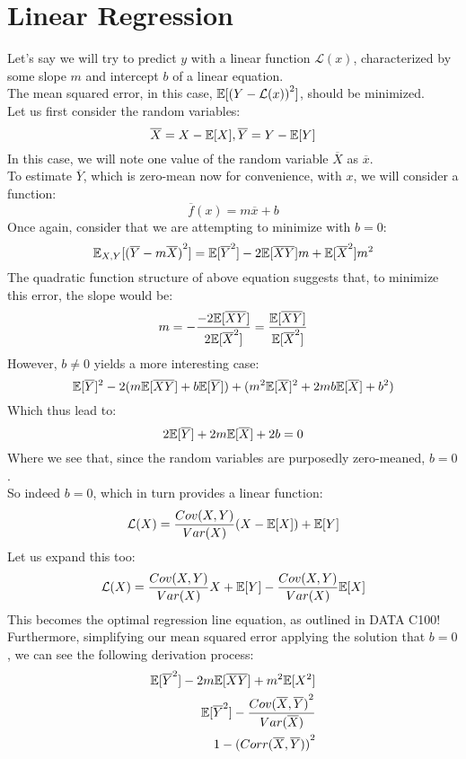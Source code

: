 \section{Linear Regression}
Let's say we will try to predict $y$ with a linear function $\mathcal{L}(x)$, characterized by some slope $m$ and intercept $b$ of a linear equation. \\
The mean squared error, in this case, $\mathbb{E}[{(Y - \mathcal{L}(x))} ^ 2]$, should be minimized. \\
Let us first consider the random variables:
\[\overline{X} = X - \mathbb{E}[X], \overline{Y} = Y - \mathbb{E}[Y]\]
In this case, we will note one value of the random variable $\overline{X}$ as $\overline{x}$. \\
To estimate $\overline{Y}$, which is zero-mean now for convenience, with $x$, we will consider a function:
\[\overline{f}(x) = m \overline{x} + b\]
Once again, consider that we are attempting to minimize with $b = 0$:
\[\mathbb{E}_{X, Y}[{(\overline{Y} - m \overline{X})}^2] = \mathbb{E}[\overline{Y}^2] - 2 \mathbb{E}[\overline{X} \overline{Y}]m + \mathbb{E}[\overline{X}^2]m^2\]
The quadratic function structure of above equation suggests that, to minimize this error, the slope would be:
\[m = -\frac{-2\mathbb{E}[\overline{X} \overline{Y}]}{2 \mathbb{E}[\overline{X}^2]} = \frac{\mathbb{E}[\overline{X} \overline{Y}]}{\mathbb{E}[\overline{X}^2]}\]
However, $b \neq 0$ yields a more interesting case:
\[
    \mathbb{E}[\overline{Y}]^2 - 2(m \mathbb{E}[\overline{X} \overline{Y}] + b \mathbb{E}[\overline{Y}]) + (m^2 \mathbb{E}[\overline{X}]^2 + 2mb\mathbb{E}[\overline{X}] + b^2)
\]
Which thus lead to:
\[
    2\mathbb{E}[\overline{Y}] + 2m\mathbb{E}[\overline{X}] + 2b = 0
\]
Where we see that, since the random variables are purposedly zero-meaned, $b = 0$. \\
So indeed $b = 0$, which in turn provides a linear function:
\[
    \mathcal{L}(X) = \frac{Cov(X, Y)}{Var(X)}(X - \mathbb{E}[X]) + \mathbb{E}[Y]
\]
Let us expand this too:
\[
    \mathcal{L}(X) = \frac{Cov(X, Y)}{Var(X)}X + \mathbb{E}[Y] - \frac{Cov(X, Y)}{Var(X)}\mathbb{E}[X]
\]
This becomes the optimal regression line equation, as outlined in DATA C100! \\
Furthermore, simplifying our mean squared error applying the solution that $b = 0$, we can see the following derivation process:
\begin{align*}
    \mathbb{E}[\overline{Y} ^ 2] - 2m\mathbb{E}[\overline{X} \overline{Y}] + m^2 \mathbb{E}[X^2] \\
    \mathbb{E}[\overline{Y} ^ 2] - \frac{{Cov(\overline{X}, \overline{Y})} ^ 2}{Var(\overline{X})} \\
    1 - {(Corr(\overline{X}, \overline{Y}))} ^ 2
\end{align*}
